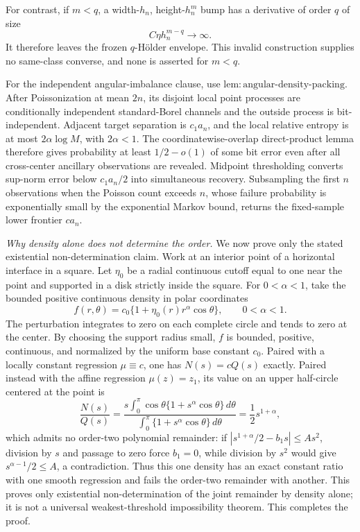 For contrast, if \(m<q\), a width-\(h_n\), height-\(h_n^m\) bump has a derivative of order \(q\) of size
\[
 C\eta h_n^{m-q}\longrightarrow\infty.
\]
It therefore leaves the frozen \(q\)-H\"older envelope.  This invalid construction supplies no same-class converse, and none is asserted for \(m<q\).

For the independent angular-imbalance clause, use \(\mathrm{lem:angular\text{-}density\text{-}packing}\).  After Poissonization at mean \(2n\), its disjoint local point processes are conditionally independent standard-Borel channels and the outside process is bit-independent.  Adjacent target separation is \(c_1a_n\), and the local relative entropy is at most \(2\alpha\log M\), with \(2\alpha<1\).  The coordinatewise-overlap direct-product lemma therefore gives probability at least \(1/2-o(1)\) of some bit error even after all cross-center ancillary observations are revealed.  Midpoint thresholding converts sup-norm error below \(c_1a_n/2\) into simultaneous recovery.  Subsampling the first \(n\) observations when the Poisson count exceeds \(n\), whose failure probability is exponentially small by the exponential Markov bound, returns the fixed-sample lower frontier \(ca_n\).

\emph{Why density alone does not determine the order.}
We now prove only the stated existential non-determination claim.  Work at an interior point of a horizontal interface in a square.  Let \(\eta_0\) be a radial continuous cutoff equal to one near the point and supported in a disk strictly inside the square.  For \(0<\alpha<1\), take the bounded positive continuous density in polar coordinates
\[
 f(r,\theta)=c_0\{1+\eta_0(r)r^\alpha\cos\theta\},
 \qquad 0<\alpha<1.
\]
The perturbation integrates to zero on each complete circle and tends to zero at the center.  By choosing the support radius small, \(f\) is bounded, positive, continuous, and normalized by the uniform base constant \(c_0\).  Paired with a locally constant regression \(\mu\equiv c\), one has \(N(s)=cQ(s)\) exactly.  Paired instead with the affine regression \(\mu(z)=z_1\), its value on an upper half-circle centered at the point is
\[
 \frac{N(s)}{Q(s)}
 =\frac{s\int_0^\pi\cos\theta\{1+s^\alpha\cos\theta\}\,d\theta}
 {\int_0^\pi\{1+s^\alpha\cos\theta\}\,d\theta}
 =\frac12s^{1+\alpha},
\]
which admits no order-two polynomial remainder: if \(|s^{1+\alpha}/2-b_1s|\leq As^2\), division by \(s\) and passage to zero force \(b_1=0\), while division by \(s^2\) would give \(s^{\alpha-1}/2\leq A\), a contradiction.  Thus this one density has an exact constant ratio with one smooth regression and fails the order-two remainder with another.  This proves only existential non-determination of the joint remainder by density alone; it is not a universal weakest-threshold impossibility theorem.  This completes the proof.